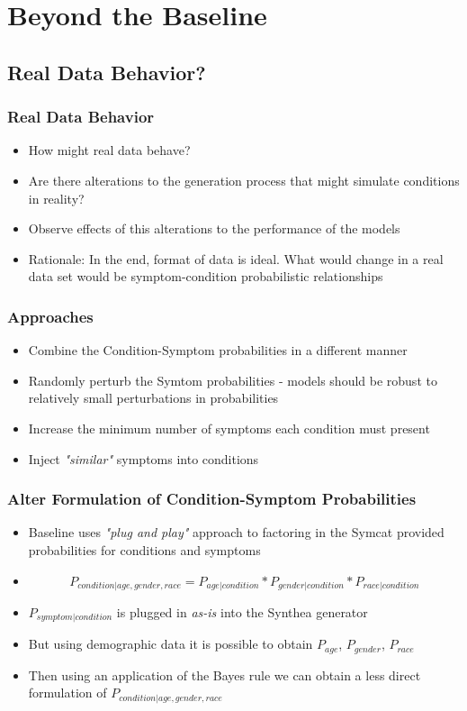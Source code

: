 \documentclass{beamer}
\begin{document}
\section{Beyond the Baseline}
\subsection{Real Data Behavior?}
\begin{frame}
\frametitle{Real Data Behavior}
\begin{itemize}
	\item How might real data behave?
	\item Are there alterations to the generation process that might simulate conditions in reality?
	\item Observe effects of this alterations to the performance of the models
	\item Rationale: In the end, format of data is ideal. What would change in a real data set would be symptom-condition probabilistic relationships
\end{itemize}
\end{frame}

\begin{frame}
\frametitle{Approaches}
\begin{itemize}
	\item Combine the Condition-Symptom probabilities in a different manner
	\item Randomly perturb the Symtom probabilities - models should be robust to relatively small perturbations in probabilities
	\item Increase the minimum number of symptoms each condition must present
	\item Inject \textit{"similar"} symptoms into conditions
\end{itemize}
\end{frame}


\begin{frame}
\frametitle{Alter Formulation of Condition-Symptom Probabilities}
\begin{itemize}
	\item Baseline uses \textit{"plug and play"} approach to factoring in the Symcat provided probabilities for conditions and symptoms
	\item $$
		P_{condition | age, gender, race} = P_{age|condition} * P_{gender|condition} * P_{race|condition}
	$$
	\item $P_{symptom|condition}$ is plugged in \textit{as-is} into the  Synthea generator
	\item But using demographic data it is possible to obtain $P_{age}$, $P_{gender}$, $P_{race}$
	\item Then using an application of the Bayes rule we can obtain a less direct formulation of $P_{condition | age, gender, race}$
\end{itemize}
\end{frame}
\end{document}
